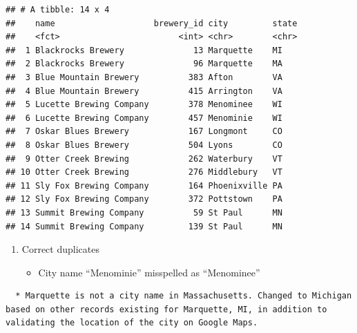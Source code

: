 \documentclass[]{article}
\newenvironment{Shaded}{\begin{snugshade}}{\end{snugshade}}
\newcommand{\KeywordTok}[1]{\textcolor[rgb]{0.13,0.29,0.53}{\textbf{#1}}}
\newcommand{\DataTypeTok}[1]{\textcolor[rgb]{0.13,0.29,0.53}{#1}}
\newcommand{\DecValTok}[1]{\textcolor[rgb]{0.00,0.00,0.81}{#1}}
\newcommand{\StringTok}[1]{\textcolor[rgb]{0.31,0.60,0.02}{#1}}
\newcommand{\CommentTok}[1]{\textcolor[rgb]{0.56,0.35,0.01}{\textit{#1}}}
\newcommand{\OperatorTok}[1]{\textcolor[rgb]{0.81,0.36,0.00}{\textbf{#1}}}
\newcommand{\NormalTok}[1]{#1}
\providecommand{\tightlist}{%
  \setlength{\itemsep}{0pt}\setlength{\parskip}{0pt}}
\begin{document}
\begin{verbatim}
## # A tibble: 14 x 4
##    name                    brewery_id city         state
##    <fct>                        <int> <chr>        <chr>
##  1 Blackrocks Brewery              13 Marquette    MI   
##  2 Blackrocks Brewery              96 Marquette    MA   
##  3 Blue Mountain Brewery          383 Afton        VA   
##  4 Blue Mountain Brewery          415 Arrington    VA   
##  5 Lucette Brewing Company        378 Menominee    WI   
##  6 Lucette Brewing Company        457 Menominie    WI   
##  7 Oskar Blues Brewery            167 Longmont     CO   
##  8 Oskar Blues Brewery            504 Lyons        CO   
##  9 Otter Creek Brewing            262 Waterbury    VT   
## 10 Otter Creek Brewing            276 Middlebury   VT   
## 11 Sly Fox Brewing Company        164 Phoenixville PA   
## 12 Sly Fox Brewing Company        372 Pottstown    PA   
## 13 Summit Brewing Company          59 St Paul      MN   
## 14 Summit Brewing Company         139 St Paul      MN
\end{verbatim}

\begin{enumerate}
\def\labelenumi{\arabic{enumi})}
\setcounter{enumi}{3}
\item
  Correct duplicates

  \begin{itemize}
  \tightlist
  \item
    City name ``Menominie'' misspelled as ``Menominee''
  \end{itemize}
\end{enumerate}

\begin{Shaded}
\end{Shaded}

\begin{verbatim}
  * Marquette is not a city name in Massachusetts. Changed to Michigan based on other records existing for Marquette, MI, in addition to validating the location of the city on Google Maps.
\end{verbatim}
\end{document}
